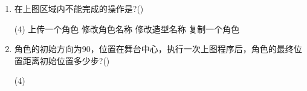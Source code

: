 \documentclass[10pt, a4paper]{article}
\begin{document}
\begin{enumerate}
        \item 在上图区域内不能完成的操作是?(\qquad)
        \begin{tasks}(4)
            \task 上传一个角色
            \task 修改角色名称
            \task 修改造型名称
            \task 复制一个角色
        \end{tasks}


        \item 角色的初始方向为90，位置在舞台中心，执行一次上图程序后，角色的最终位置距离初始位置多少步?(\qquad)
        \begin{tasks}(4)
        \end{tasks}



\end{enumerate}
\end{document}
